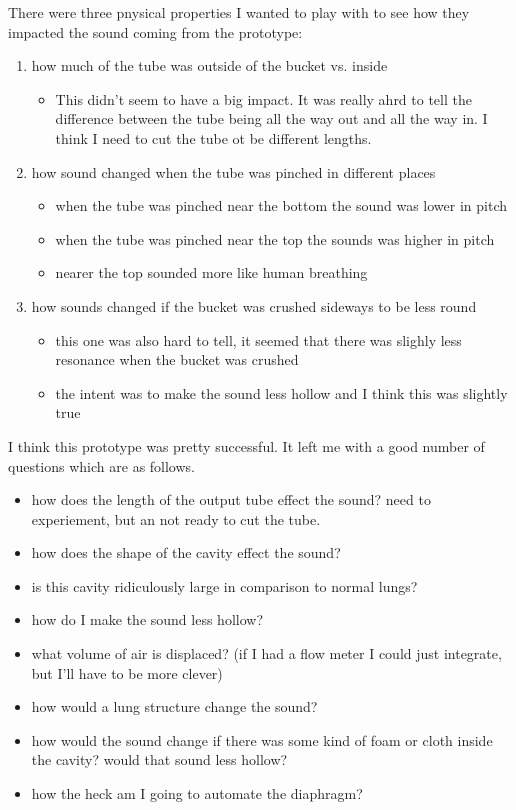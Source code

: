 \documentclass[11pt]{report}
\begin{document}
\begin{itmemize}
There were three pnysical properties I wanted to play with to see how they impacted the sound coming from the prototype:
\begin{enumerate}
\item
how much of the tube was outside of the bucket vs. inside
\begin{itemize}
\item
This didn't seem to have a big impact. It was really ahrd to tell the difference between the tube being all the way out and all the way in. I think I need to cut the tube ot be different lengths.
\end{itemize}
\item
how sound changed when the tube was pinched in different places
\begin{itemize}
  \item
    when the tube was pinched near the bottom the sound was lower in pitch
  \item
    when the tube was pinched near the top the sounds was higher in pitch
  \item
    nearer the top sounded more like human breathing
\end{itemize}
\item
how sounds changed if the bucket was crushed sideways to be less round
\begin{itemize}
  \item
    this one was also hard to tell, it seemed that there was slighly less resonance when the bucket was crushed
  \item
    the intent was to make the sound less hollow and I think this was slightly true
\end{itemize}

\end{enumerate}

\vspace{1cm}
I think this prototype was pretty successful. It left me with a good number of questions which are as follows.
\begin{itemize}
\item
  how does the length of the output tube effect the sound? need to experiement, but an not ready to cut the tube.
\item
  how does the shape of the cavity effect the sound?
\item
  is this cavity ridiculously large in comparison to normal lungs?
\item
  how do I make the sound less hollow?
\item
  what volume of air is displaced? (if I had a flow meter I could just integrate, but I'll have to be more clever)
\item
  how would a lung structure change the sound?
\item
  how would the sound change if there was some kind of foam or cloth inside the cavity? would that sound less hollow?
\item
  how the heck am I going to automate the diaphragm?
\end{itemize}
\newpage

\end{itmemize}
\end{document}
